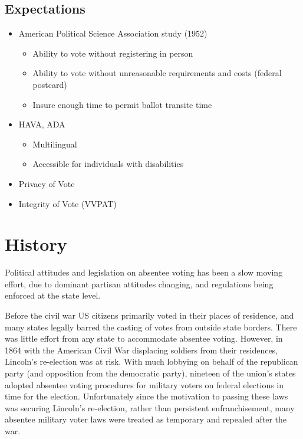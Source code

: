 \subsection{Expectations}

\begin{itemize}
\item American Political Science Association study (1952)
  \begin{itemize}
  \item Ability to vote without registering in person
  \item Ability to vote without unreasonable requirements and costs (federal postcard)
  \item Insure enough time to permit ballot transite time
  \end{itemize}
\item HAVA, ADA
\begin{itemize}
  \item Multilingual
  \item Accessible for individuals with disabilities
\end{itemize}
\item Privacy of Vote
\item Integrity of Vote (VVPAT)
\end{itemize}

\section{History}
Political attitudes and legislation on absentee voting has been a slow moving effort, due to dominant partisan attitudes changing, and regulations being enforced at the state level.

Before the civil war US citizens primarily voted in their places of residence, and many states legally barred the casting of votes from outside state borders. There was little effort from any state to accommodate absentee voting. However, in 1864 with the American Civil War displacing soldiers from their residences, Lincoln's re-election was at risk. With much lobbying on behalf of the republican party (and opposition from the democratic party), nineteen of the union's states adopted absentee voting procedures for military voters on federal elections in time for the election. %
Unfortunately since the motivation to passing these laws was securing Lincoln's re-election, rather than persistent enfranchisement, many absentee military voter laws were treated as temporary and repealed after the war.


